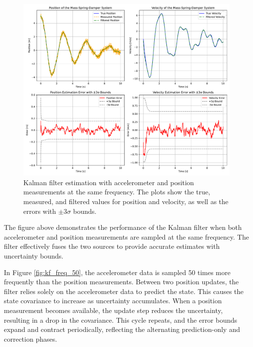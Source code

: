 \begin{figure}[H]
    \centering
    \includegraphics[width=1\textwidth]{figures/kf_same_freq.pdf}
    \caption{Kalman filter estimation with accelerometer and position measurements at the same frequency. The plots show the true, measured, and filtered values for position and velocity, as well as the errors with $\pm 3\sigma$ bounds.}
    \label{fig:kf_same_freq}
\end{figure}

The figure above demonstrates the performance of the Kalman filter when both accelerometer  
and position measurements are sampled at the same frequency. The filter effectively fuses  
the two sources to provide accurate estimates with uncertainty bounds.

In Figure \ref{fig:kf_freq_50}, the accelerometer data is sampled 50 times more frequently  
than the position measurements. Between two position updates, the filter relies solely on  
the accelerometer data to predict the state. This causes the state covariance to increase as  
uncertainty accumulates. When a position measurement becomes available, the update step  
reduces the uncertainty, resulting in a drop in the covariance. This cycle repeats, and the  
error bounds expand and contract periodically, reflecting the alternating prediction-only  
and correction phases.

